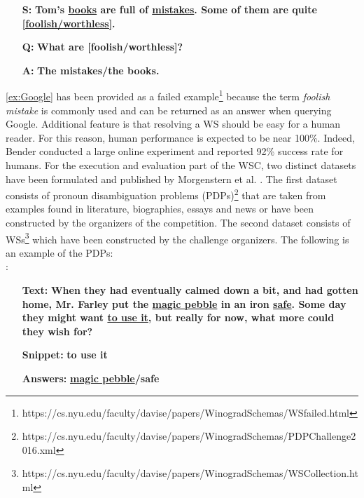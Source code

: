 \begin{itemize} 
	\item[\textbf{S:}] \textbf{Tom's \underline{books} are full of \underline{mistakes}. Some of them are quite \underline{[foolish/worthless]}.}
	\item[\textbf{Q:}] \textbf{What are [foolish/worthless]?}
	\item[\textbf{A:}] \textbf{The mistakes/the books.} 
\end{itemize} 

\ref{ex:Google} has been provided as a failed example\footnote{https://cs.nyu.edu/faculty/davise/papers/WinogradSchemas/WSfailed.html} because the term \textit{foolish mistake} is commonly used and can be returned as an answer when querying Google. Additional feature is that resolving a WS should be easy  for a human reader. For this reason, human performance is expected to be near 100\%. Indeed, Bender \cite{DBLP:conf/maics/Bender15} conducted a large online experiment and reported 92\% success rate for humans. 
For the execution and evaluation part of the WSC, two distinct datasets have been formulated and published by Morgenstern et al. \cite{DBLP:journals/aim/MorgensternDO16}.
The first dataset consists of pronoun disambiguation problems (PDPs)\footnote{https://cs.nyu.edu/faculty/davise/papers/WinogradSchemas/PDPChallenge2016.xml} that are taken from examples found in literature, biographies, essays and news or have been constructed by the organizers of the competition. 
The second dataset consists of WSs\footnote{https://cs.nyu.edu/faculty/davise/papers/WinogradSchemas/WSCollection.html} which have been constructed by the challenge organizers.
The following is an example of the PDPs:\\
:

\begin{itemize}[align=left] 
	\item [\textbf{Text:}] \textbf{When they had eventually calmed down a bit, and had gotten home, Mr. Farley put the \underline{magic pebble} in an iron \underline{safe}. Some day they might want \underline{to use it}, but really for now, what more could they wish for?}
	
	\item [\textbf{Snippet:}] \textbf{to use it}
	\item [\textbf{Answers:}] \textbf{\underline{magic pebble}/safe}

\end{itemize}

